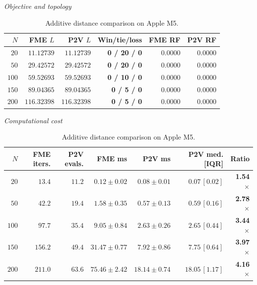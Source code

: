 \begin{table}[!htbp]
\centering\small
\setlength{\tabcolsep}{4pt}
\caption{Additive distance comparison on Apple M5.}
\label{tab:bench_noiseless}
\par\smallskip
\textit{Objective and topology}\par\smallskip
\begin{tabular}{@{}rrrrrr@{}}
\toprule
$N$ & FME $L$ & P2V $L$ & Win/tie/loss & FME RF & P2V RF\\
\midrule
$20$ & $11.12739$ & $11.12739$ & \textbf{0 / 20 / 0} & $0.0000$ & $0.0000$\\
$50$ & $29.42572$ & $29.42572$ & \textbf{0 / 20 / 0} & $0.0000$ & $0.0000$\\
$100$ & $59.52693$ & $59.52693$ & \textbf{0 / 10 / 0} & $0.0000$ & $0.0000$\\
$150$ & $89.04365$ & $89.04365$ & \textbf{0 / 5 / 0} & $0.0000$ & $0.0000$\\
$200$ & $116.32398$ & $116.32398$ & \textbf{0 / 5 / 0} & $0.0000$ & $0.0000$\\
\bottomrule
\end{tabular}
\par\smallskip
\textit{Computational cost}\par\smallskip
\begin{tabular}{@{}rrrrrrr@{}}
\toprule
$N$ & FME iters. & P2V evals. & FME ms & P2V ms & P2V med. [IQR] & Ratio\\
\midrule
$20$ & $13.4$ & $11.2$ & $0.12 \pm 0.02$ & $0.08 \pm 0.01$ & $0.07\,[0.02]$ & \textbf{1.54$\times$}\\
$50$ & $42.2$ & $19.4$ & $1.58 \pm 0.35$ & $0.57 \pm 0.13$ & $0.59\,[0.16]$ & \textbf{2.78$\times$}\\
$100$ & $97.7$ & $35.4$ & $9.05 \pm 0.84$ & $2.63 \pm 0.26$ & $2.65\,[0.44]$ & \textbf{3.44$\times$}\\
$150$ & $156.2$ & $49.4$ & $31.47 \pm 0.77$ & $7.92 \pm 0.86$ & $7.75\,[0.64]$ & \textbf{3.97$\times$}\\
$200$ & $211.0$ & $63.6$ & $75.46 \pm 2.42$ & $18.14 \pm 0.74$ & $18.05\,[1.17]$ & \textbf{4.16$\times$}\\
\bottomrule
\end{tabular}

\end{table}

